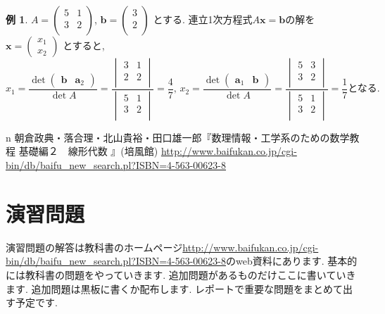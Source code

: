 \documentclass[dvipdfmx,a4paper,11pt]{article} %
\theoremstyle{definition}
\newtheorem{exa}[thm]{例}
\begin{document}
\begin{exa}
$
A = 
\begin{pmatrix}
5 &1\\
3&2 \\ 
\end{pmatrix}
$, $
\bm{b} = 
\begin{pmatrix}
3\\
2 \\ 
\end{pmatrix}
$
とする. 
連立1次方程式$A \bm{x} =\bm{b}$の解を
$
\bm{x}= \begin{pmatrix}
x_1 \\x_2
\end{pmatrix} 
$
とすると,
$$
x_1 = \frac{\det
\begin{pmatrix}
 \bm{b}& \bm{a}_{2}
\end{pmatrix}
}{\det A}
= 
\frac{ 
\begin{vmatrix}
3&1\\
2&2 \\
\end{vmatrix}
}
{
\begin{vmatrix}
5&1\\
3&2 \\
\end{vmatrix}
}
=\frac{4}{7} 
\text{, }
x_2 = \frac{\det
\begin{pmatrix}
\bm{a}_{1}& \bm{b}
\end{pmatrix}
}{\det A}
= 
\frac{ 
\begin{vmatrix}
5&3\\
3&2 \\
\end{vmatrix}
}
{
\begin{vmatrix}
5&1\\
3&2 \\
\end{vmatrix}
}
=\frac{1}{7}
\text{となる.}
$$
\end{exa}


\begin{thebibliography}{n}
朝倉政典・落合理・北山貴裕・田口雄一郎『数理情報・工学系のための数学教程 基礎編２　線形代数 』(培風館)
\url{http://www.baifukan.co.jp/cgi-bin/db/baifu_new_search.pl?ISBN=4-563-00623-8}
\end{thebibliography}
 

\newpage

\section{演習問題}
演習問題の解答は教科書のホームページ\url{http://www.baifukan.co.jp/cgi-bin/db/baifu_new_search.pl?ISBN=4-563-00623-8}のweb資料にあります.
基本的には教科書の問題をやっていきます. 
追加問題があるものだけここに書いていきます. 追加問題は黒板に書くか配布します.  
レポートで重要な問題をまとめて出す予定です.
\end{document}
